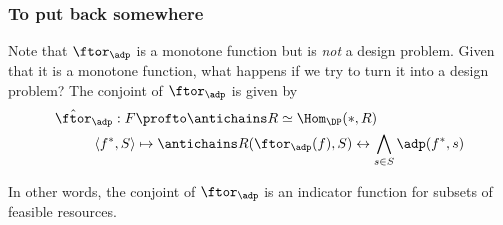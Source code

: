  

\subsubsection{To put back somewhere}
Note that $\ftor_\adp$ is a monotone function but is \emph{not} a design problem. Given that it is a monotone function, what happens if we try to turn it into a design problem? The conjoint of $\ftor_\adp$ is given by
\begin{equation*}
    \begin{aligned}
        \hat \ftor_\adp : F &\profto \antichains R \simeq \Hom_\DP(\ast, R) \\
        \langle f^*, S \rangle &\mapsto \antichains R(\ftor_\adp(f), S) \leftrightarrow \bigwedge_{s\in S} \adp(f^*, s)
    \end{aligned}
\end{equation*}

In other words, the conjoint of $\ftor_\adp$ is an indicator function for subsets of feasible resources.
